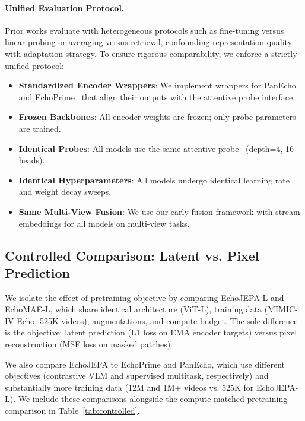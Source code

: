 \documentclass{article}
\theoremstyle{plain}
\theoremstyle{definition}
\theoremstyle{remark}
\begin{document}
\paragraph{Unified Evaluation Protocol.}
Prior works evaluate with heterogeneous protocols such as fine-tuning versus linear probing or averaging versus retrieval, confounding representation quality with adaptation strategy.
To ensure rigorous comparability, we enforce a strictly unified protocol:
\begin{itemize}[leftmargin=*, nosep, topsep=0pt]

\item \textbf{Standardized Encoder Wrappers}: We implement wrappers for PanEcho~\citep{panecho} and EchoPrime~\citep{echoprime} that align their outputs with the attentive probe interface.

\item \textbf{Frozen Backbones}: All encoder weights are frozen; only probe parameters are trained.

\item \textbf{Identical Probes}: All models use the same attentive probe~\citep{vjepa2} (depth=4, 16 heads).

\item \textbf{Identical Hyperparameters}: All models undergo identical learning rate and weight decay sweeps.

\item \textbf{Same Multi-View Fusion}: We use our early fusion framework with stream embeddings for all models on multi-view tasks.

\end{itemize}

\subsection{Controlled Comparison: Latent vs. Pixel Prediction}
\label{sec:exp:controlled}

We isolate the effect of pretraining objective by comparing EchoJEPA-L and EchoMAE-L, which share identical architecture (ViT-L), training data (MIMIC-IV-Echo, 525K videos), augmentations, and compute budget. The sole difference is the objective: latent prediction (L1 loss on EMA encoder targets) versus pixel reconstruction (MSE loss on masked patches). 

We also compare EchoJEPA to EchoPrime and PanEcho, which use different objectives (contrastive VLM and supervised multitask, respectively) and substantially more training data (12M and 1M+ videos vs. 525K for EchoJEPA-L). We include these comparisons alongside the compute-matched pretraining comparison in Table~\ref{tab:controlled}.
\end{document}
